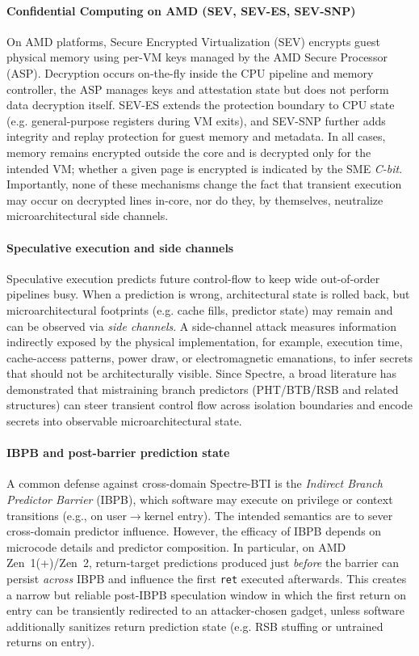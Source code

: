 \documentclass[11pt,a4paper]{article}
\begin{document}
\paragraph{Confidential Computing on AMD (SEV, SEV-ES, SEV-SNP)}
On AMD platforms, Secure Encrypted Virtualization (SEV) encrypts guest physical memory using per-VM keys managed by the AMD Secure Processor (ASP). Decryption occurs on-the-fly inside the CPU pipeline and memory controller, the ASP manages keys and attestation state but does not perform data decryption itself. SEV-ES extends the protection boundary to CPU state (e.g. general-purpose registers during VM exits), and SEV-SNP further adds integrity and replay protection for guest memory and metadata. In all cases, memory remains encrypted outside the core and is decrypted only for the intended VM; whether a given page is encrypted is indicated by the SME \emph{C-bit}. Importantly, none of these mechanisms change the fact that transient execution may occur on decrypted lines in-core, nor do they, by themselves, neutralize microarchitectural side channels.

\paragraph{Speculative execution and side channels}
Speculative execution predicts future control-flow to keep wide out-of-order pipelines busy. When a prediction is wrong, architectural state is rolled back, but microarchitectural footprints (e.g. cache fills, predictor state) may remain and can be observed via \emph{side channels}. A side-channel attack measures information indirectly exposed by the physical implementation, for example, execution time, cache-access patterns, power draw, or electromagnetic emanations, to infer secrets that should not be architecturally visible. Since Spectre, a broad literature has demonstrated that mistraining branch predictors (PHT/BTB/RSB and related structures) can steer transient control flow across isolation boundaries and encode secrets into observable microarchitectural state.

\paragraph{IBPB and post-barrier prediction state}
A common defense against cross-domain Spectre-BTI is the \emph{Indirect Branch Predictor Barrier} (IBPB), which software may execute on privilege or context transitions (e.g., on user$\rightarrow$kernel entry). The intended semantics are to sever cross-domain predictor influence. However, the efficacy of IBPB depends on microcode details and predictor composition. In particular, on AMD Zen~1(+)/Zen~2, return-target predictions produced just \emph{before} the barrier can persist \emph{across} IBPB and influence the first \texttt{ret} executed afterwards. This creates a narrow but reliable post-IBPB speculation window in which the first return on entry can be transiently redirected to an attacker-chosen gadget, unless software additionally sanitizes return prediction state (e.g. RSB stuffing or untrained returns on entry).
\end{document}
